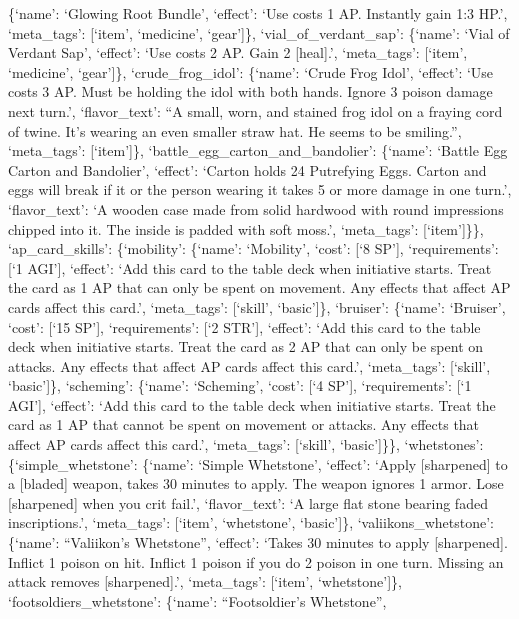 \documentclass[
  letterpaper,
  DIV=11,
  numbers=noendperiod]{scrartcl}
\begin{document}
\{`name': `Glowing Root Bundle', `effect': `Use costs 1 AP. Instantly
gain 1:3 HP.', `meta\_tags': {[}`item', `medicine', `gear'{]}\},
`vial\_of\_verdant\_sap': \{`name': `Vial of Verdant Sap', `effect':
`Use costs 2 AP. Gain 2 {[}heal{]}.', `meta\_tags': {[}`item',
`medicine', `gear'{]}\}, `crude\_frog\_idol': \{`name': `Crude Frog
Idol', `effect': `Use costs 3 AP. Must be holding the idol with both
hands. Ignore 3 poison damage next turn.', `flavor\_text': ``A small,
worn, and stained frog idol on a fraying cord of twine. It's wearing an
even smaller straw hat. He seems to be smiling.'', `meta\_tags':
{[}`item'{]}\}, `battle\_egg\_carton\_and\_bandolier': \{`name': `Battle
Egg Carton and Bandolier', `effect': `Carton holds 24 Putrefying Eggs.
Carton and eggs will break if it or the person wearing it takes 5 or
more damage in one turn.', `flavor\_text': `A wooden case made from
solid hardwood with round impressions chipped into it. The inside is
padded with soft moss.', `meta\_tags': {[}`item'{]}\}\},
`ap\_card\_skills': \{`mobility': \{`name': `Mobility', `cost': {[}`8
SP'{]}, `requirements': {[}`1 AGI'{]}, `effect': `Add this card to the
table deck when initiative starts. Treat the card as 1 AP that can only
be spent on movement. Any effects that affect AP cards affect this
card.', `meta\_tags': {[}`skill', `basic'{]}\}, `bruiser': \{`name':
`Bruiser', `cost': {[}`15 SP'{]}, `requirements': {[}`2 STR'{]},
`effect': `Add this card to the table deck when initiative starts. Treat
the card as 2 AP that can only be spent on attacks. Any effects that
affect AP cards affect this card.', `meta\_tags': {[}`skill',
`basic'{]}\}, `scheming': \{`name': `Scheming', `cost': {[}`4 SP'{]},
`requirements': {[}`1 AGI'{]}, `effect': `Add this card to the table
deck when initiative starts. Treat the card as 1 AP that cannot be spent
on movement or attacks. Any effects that affect AP cards affect this
card.', `meta\_tags': {[}`skill', `basic'{]}\}\}, `whetstones':
\{`simple\_whetstone': \{`name': `Simple Whetstone', `effect': `Apply
{[}sharpened{]} to a {[}bladed{]} weapon, takes 30 minutes to apply. The
weapon ignores 1 armor. Lose {[}sharpened{]} when you crit fail.',
`flavor\_text': `A large flat stone bearing faded inscriptions.',
`meta\_tags': {[}`item', `whetstone', `basic'{]}\},
`valiikons\_whetstone': \{`name': ``Valiikon's Whetstone'', `effect':
`Takes 30 minutes to apply {[}sharpened{]}. Inflict 1 poison on hit.
Inflict 1 poison if you do 2 poison in one turn. Missing an attack
removes {[}sharpened{]}.', `meta\_tags': {[}`item', `whetstone'{]}\},
`footsoldiers\_whetstone': \{`name': ``Footsoldier's Whetstone'',
\end{document}
